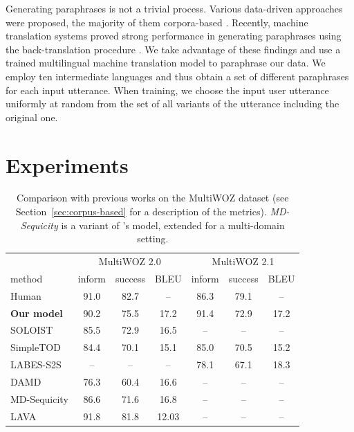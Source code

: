 \documentclass[11pt,a4paper]{article}
\newcommand{\Augpt}[0]{Our model\xspace}
\begin{document}
Generating paraphrases is not a trivial process.
Various data-driven approaches were proposed, the majority of them corpora-based \cite{madnani2010generating}.
Recently, machine translation systems proved strong performance in generating paraphrases using the back-translation procedure \cite{sennrich2016,edunov2018,federmann2019multilingual}.
We take advantage of these findings and use a trained multilingual machine translation model \cite{machavcek2020elitr,edunov2018} to paraphrase our data.
We employ ten intermediate languages and thus obtain a set of different paraphrases for each input utterance.
When training, we choose the input user utterance uniformly at random from the set of all variants of the utterance including the original one.

\section{Experiments}
\label{sec:experiments}
\begin{table}[htbp]
    \centering
    \begin{tabular}{l|ccc|ccc}
      \toprule
      & \multicolumn{3}{c|}{MultiWOZ 2.0} & \multicolumn{3}{c}{MultiWOZ 2.1} \\
      method & inform & success & BLEU & inform & success & BLEU \\
      \midrule
      Human & 91.0 & 82.7 & -- & 86.3 & 79.1 & -- \\
      \midrule
      \textbf{\Augpt} & 90.2 & 75.5 & 17.2 & 91.4 & 72.9 & 17.2 \\
      SOLOIST \cite{peng2020} & 85.5 & 72.9 & 16.5 & -- & -- & -- \\
      SimpleTOD \cite{hosseini2020} & 84.4 & 70.1 & 15.1 & 85.0 & 70.5 & 15.2 \\
      LABES-S2S \cite{zhang2020end2end} & -- & -- & -- & 78.1 & 67.1 & 18.3 \\
      DAMD \cite{zhang2019} & 76.3 & 60.4 & 16.6 & -- & -- & -- \\
      MD-Sequicity \cite{zhang2019} & 86.6 & 71.6 & 16.8 & -- & -- & -- \\
      LAVA \cite{lubis-etal-2020-lava} & 91.8 & 81.8 & 12.03 & -- & -- & -- \\
      \bottomrule
  \end{tabular}
  \caption{Comparison with previous works on the MultiWOZ dataset (see Section~\ref{sec:corpus-based} for a description of the metrics). \emph{MD-Sequicity} is a variant of \citet{lei2018}'s model, extended for a multi-domain setting.}
  \label{tab:multiwoz_sota_comparison}
\end{table}
\end{document}
